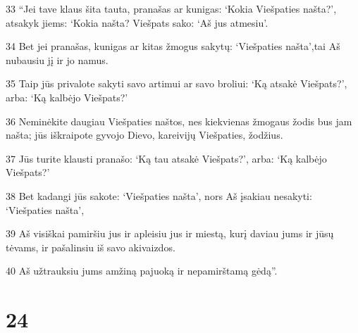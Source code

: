 \par 33 “Jei tave klaus šita tauta, pranašas ar kunigas: ‘Kokia Viešpaties našta?’, atsakyk jiems: ‘Kokia našta? Viešpats sako: ‘Aš jus atmesiu’. 
\par 34 Bet jei pranašas, kunigas ar kitas žmogus sakytų: ‘Viešpaties našta’,­tai Aš nubausiu jį ir jo namus. 
\par 35 Taip jūs privalote sakyti savo artimui ar savo broliui: ‘Ką atsakė Viešpats?’, arba: ‘Ką kalbėjo Viešpats?’ 
\par 36 Neminėkite daugiau Viešpaties naštos, nes kiekvienas žmogaus žodis bus jam našta; jūs iškraipote gyvojo Dievo, kareivijų Viešpaties, žodžius. 
\par 37 Jūs turite klausti pranašo: ‘Ką tau atsakė Viešpats?’, arba: ‘Ką kalbėjo Viešpats?’ 
\par 38 Bet kadangi jūs sakote: ‘Viešpaties našta’, nors Aš įsakiau nesakyti: ‘Viešpaties našta’, 
\par 39 Aš visiškai pamiršiu jus ir apleisiu jus ir miestą, kurį daviau jums ir jūsų tėvams, ir pašalinsiu iš savo akivaizdos. 
\par 40 Aš užtrauksiu jums amžiną pajuoką ir nepamirštamą gėdą”.



\chapter{24}


